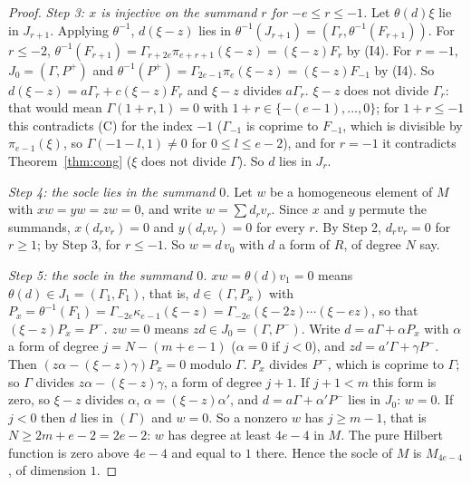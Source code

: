 \documentclass[11pt]{article}
\theoremstyle{definition}
\theoremstyle{remark}
\begin{document}
\begin{proof}
\emph{Step 3: $x$ is injective on the summand $r$ for $-e\le r\le-1$.} Let $\theta(d)\xi$ lie in $J_{r+1}$. Applying $\theta^{-1}$, $d(\xi-z)$ lies in $\theta^{-1}(J_{r+1})=(\Gamma_r,\theta^{-1}(F_{r+1}))$. For $r\le-2$, $\theta^{-1}(F_{r+1})=\Gamma_{r+2e}\pi_{e+r+1}(\xi-z)=(\xi-z)F_r$ by (I4). For $r=-1$, $J_0=(\Gamma,P^+)$ and $\theta^{-1}(P^+)=\Gamma_{2e-1}\pi_e(\xi-z)=(\xi-z)F_{-1}$ by (I4). So $d(\xi-z)=a\Gamma_r+c(\xi-z)F_r$ and $\xi-z$ divides $a\Gamma_r$. $\xi-z$ does not divide $\Gamma_r$: that would mean $\Gamma(1+r,1)=0$ with $1+r\in\{-(e-1),\dots,0\}$; for $1+r\le-1$ this contradicts (C) for the index $-1$ ($\Gamma_{-1}$ is coprime to $F_{-1}$, which is divisible by $\pi_{e-1}(\xi)$, so $\Gamma(-1-l,1)\ne0$ for $0\le l\le e-2$), and for $r=-1$ it contradicts Theorem~\ref{thm:cong} ($\xi$ does not divide $\Gamma$). So $d$ lies in $J_r$.

\emph{Step 4: the socle lies in the summand $0$.} Let $w$ be a homogeneous element of $M$ with $xw=yw=zw=0$, and write $w=\sum d_rv_r$. Since $x$ and $y$ permute the summands, $x(d_rv_r)=0$ and $y(d_rv_r)=0$ for every $r$. By Step 2, $d_rv_r=0$ for $r\ge1$; by Step 3, for $r\le-1$. So $w=d\,v_0$ with $d$ a form of $R$, of degree $N$ say.

\emph{Step 5: the socle in the summand $0$.} $xw=\theta(d)v_1=0$ means $\theta(d)\in J_1=(\Gamma_1,F_1)$, that is, $d\in(\Gamma,P_x)$ with $P_x=\theta^{-1}(F_1)=\Gamma_{-2e}\kappa_{e-1}(\xi-z)=\Gamma_{-2e}(\xi-2z)\cdots(\xi-ez)$, so that $(\xi-z)P_x=P^-$. $zw=0$ means $zd\in J_0=(\Gamma,P^-)$. Write $d=a\Gamma+\alpha P_x$ with $\alpha$ a form of degree $j=N-(m+e-1)$ ($\alpha=0$ if $j<0$), and $zd=a'\Gamma+\gamma P^-$. Then $(z\alpha-(\xi-z)\gamma)P_x=0$ modulo $\Gamma$. $P_x$ divides $P^-$, which is coprime to $\Gamma$; so $\Gamma$ divides $z\alpha-(\xi-z)\gamma$, a form of degree $j+1$. If $j+1<m$ this form is zero, so $\xi-z$ divides $\alpha$, $\alpha=(\xi-z)\alpha'$, and $d=a\Gamma+\alpha'P^-$ lies in $J_0$: $w=0$. If $j<0$ then $d$ lies in $(\Gamma)$ and $w=0$. So a nonzero $w$ has $j\ge m-1$, that is $N\ge2m+e-2=2e-2$: $w$ has degree at least $4e-4$ in $M$. The pure Hilbert function is zero above $4e-4$ and equal to $1$ there. Hence the socle of $M$ is $M_{4e-4}$, of dimension $1$.


\end{proof}
\end{document}
